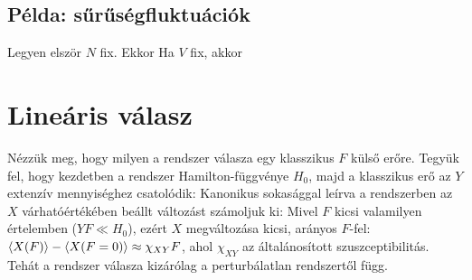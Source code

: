   \subsection{Példa: sűrűségfluktuációk}
   
   Legyen elször $N$ fix. Ekkor
   Ha $V$ fix, akkor 
   
 \section{Lineáris válasz}\label{ss:B05-linvalasz}
  
  Nézzük meg, hogy milyen a rendszer válasza egy klasszikus $F$ külső erőre. Tegyük fel, hogy kezdetben a rendszer Hamilton-függvénye $H_0$, majd a klasszikus erő az $Y$ extenzív mennyiséghez csatolódik:
  Kanonikus sokasággal leírva a rendszerben az $X$ várhatóértékében beállt változást számoljuk ki:
  Mivel $F$ kicsi valamilyen értelemben ($YF\ll H_0$), ezért $X$ megváltozása kicsi, arányos $F$-fel: $\left\langle X(F)\right\rangle-\left\langle X(F=0)\right\rangle\approx\chi_{XY} F$, ahol $\chi_{XY}$ az általánosított szuszceptibilitás. 
  Tehát a rendszer válasza kizárólag a perturbálatlan rendszertől függ.
  
